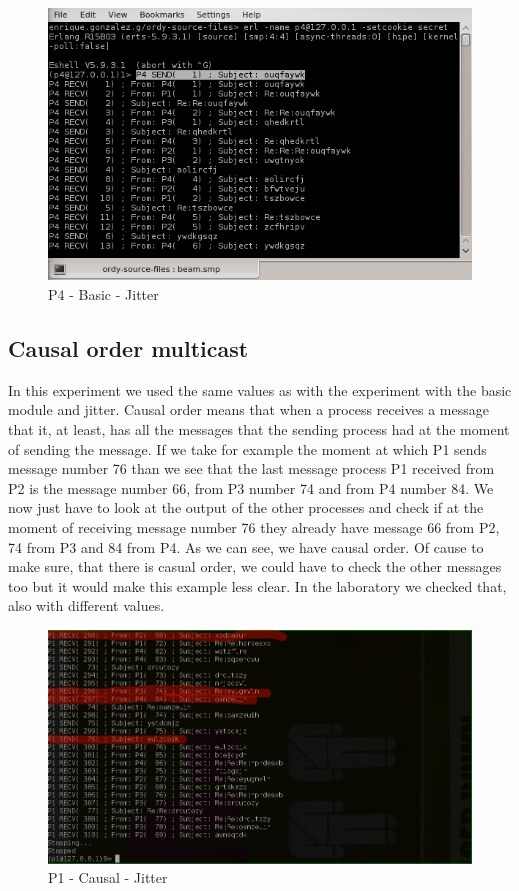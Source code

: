 \begin{figure}[h!]
\centering
\includegraphics[scale=0.8]{sections/screenshots/p4_basic.png}
\caption{P4 - Basic - Jitter}
\label{fig:p4_basic_jitter}
\end{figure}


\clearpage
\subsection{Causal order multicast}

In this experiment we used the same values as with the experiment with the basic module and jitter. Causal order means that when a process receives a message that it, at least, has all the messages that the sending process had at the moment of sending the message. 
If we take for example the moment at which P1 sends message number 76 than we see that the last message process P1 received from P2 is the message number 66, from P3 number 74 and from P4 number 84. We now just have to look at the output of the other processes and check if at the moment of receiving message number 76 they already have message 66 from P2, 74 from P3 and 84 from P4.
As we can see, we have causal order. Of cause to make sure, that there is casual order, we could have to check the other messages too but it would make this example less clear. In the laboratory we checked that, also with different values.

\begin{figure}[h!]
\centering
\includegraphics[scale=0.4]{sections/screenshots/causal_p1.png}
\caption{P1 - Causal - Jitter}
\label{fig:p1_causal_jitter}
\end{figure}

